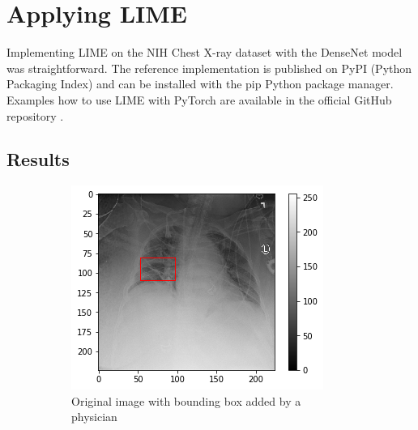 \clearpage
\section{Applying LIME}
Implementing LIME on the NIH Chest X-ray dataset with the DenseNet model was straightforward. The reference implementation is published on PyPI (Python Packaging Index) and can be installed with the pip Python package manager. Examples how to use LIME with PyTorch are available in the official GitHub repository \cite{limegithub}.


\subsection{Results}


\begin{figure}[H]
    \centering
    \begin{subfigure}[t]{.45\textwidth}
        \centering
        \includegraphics[width=\linewidth]{chapters/03_classification/images/rise0_bbox.png}
        \caption{Original image with bounding box added by a physician}
    \end{subfigure}\hspace{1cm}%
    \begin{subfigure}[t]{.45\textwidth}
        \centering

\end{subfigure}
\end{figure}

